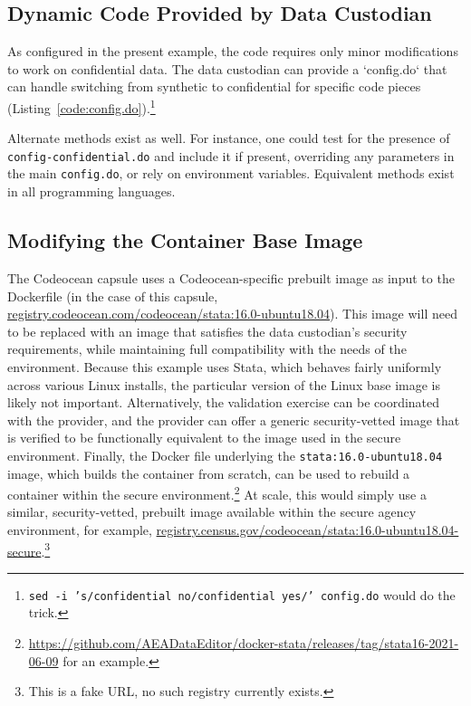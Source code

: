 \documentclass[inline]{hdsr}
\begin{document}
\subsection{Dynamic Code Provided by Data Custodian}

As configured in the present example, the code requires only minor modifications to work on confidential data. The data custodian can provide a `config.do` that can handle switching from synthetic to confidential for specific code pieces (Listing~\ref{code:config.do}).\footnote{\texttt{sed -i 's/confidential no/confidential yes/' config.do} would do the trick.}



Alternate methods exist as well. For instance, one could test for the presence of \texttt{config-confidential.do} and include it if present, overriding any parameters in the main \texttt{config.do}, or rely on environment variables. Equivalent methods exist in all programming languages.

\subsection{Modifying the Container Base Image}

The Codeocean capsule uses a Codeocean-specific prebuilt image as input to the Dockerfile  (in the case of this capsule, \url{registry.codeocean.com/codeocean/stata:16.0-ubuntu18.04}). This image will need to be replaced with an image that satisfies the data custodian's security requirements, while maintaining full compatibility with the needs of the environment. Because this example uses Stata, which behaves fairly uniformly across various Linux installs, the particular version of the Linux base image is likely not important.   Alternatively, the validation exercise can be coordinated with the provider, and the provider can offer a generic security-vetted image that is verified to be functionally equivalent to the image used in the secure environment. Finally, the Docker file underlying the \texttt{stata:16.0-ubuntu18.04} image, which builds the container from scratch, can be used to rebuild a container within the secure environment.\footnote{\href{github.com/AEADataEditor/docker-stata/releases/tag/stata16-2021-06-09}{https://github.com/AEADataEditor/docker-stata/releases/tag/stata16-2021-06-09} for an example.} At scale, this would simply use a similar, security-vetted, prebuilt image available within the secure agency environment, for example, \url{registry.census.gov/codeocean/stata:16.0-ubuntu18.04-secure}.\footnote{This is a fake URL, no such registry currently exists.}
\end{document}

